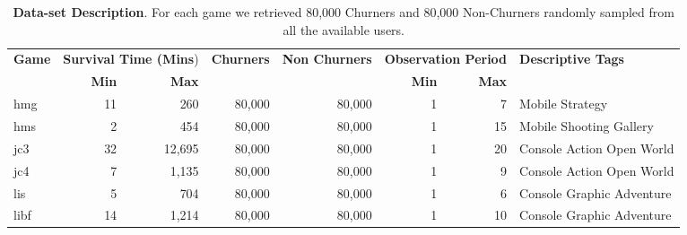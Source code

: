 \begin{table*}[h] 
\centering
\caption{\textbf{Data-set Description}. For each game we retrieved 80,000 Churners and 80,000 Non-Churners randomly sampled from all the available users.}
\label{gamesdescription}
\begin{tabularx}{\textwidth}{@{}lrrrrrrX@{}}
\toprule

\multirow{2}{*}{\textbf{Game}} & \multicolumn{2}{l}{\textbf{Survival Time (Mins})} & \multirow{2}{*}{\textbf{Churners}} & \multirow{2}{*}{\textbf{Non Churners}} & \multicolumn{2}{l}{\textbf{Observation Period}} & \multirow{2}{*}{\textbf{Descriptive Tags}} \\ \cmidrule(lr){2-3} \cmidrule(lr){6-7}
                      & \textbf{Min}                  & \textbf{Max}                  &                           &                               & \textbf{Min}                & \textbf{Max}               &                                \\ \midrule
hmg                        & 11 & 260    & 80,000 & 80,000  & 1  & 7  & Mobile Strategy                       \\
hms                        & 2 & 454     & 80,000 & 80,000  & 1  & 15 & Mobile Shooting Gallery                \\
jc3                        & 32 & 12,695 & 80,000 & 80,000  & 1  & 20 & Console Action Open World             \\
jc4                        & 7 & 1,135   & 80,000 & 80,000  & 1  & 9  & Console Action Open World           \\
lis                        & 5 & 704     & 80,000 & 80,000  & 1  & 6  & Console Graphic Adventure \\
libf                       & 14 & 1,214  & 80,000 & 80,000  & 1  & 10 &  Console Graphic Adventure \\ \bottomrule
\end{tabularx}
\end{table*}